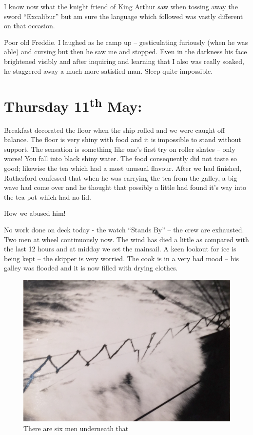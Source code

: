 \documentclass[
  11pt,
  msmallroyalvopaper
]{memoir}
\begin{document}
I know now what the knight friend of King Arthur saw when tossing away
the sword ``Excalibur'' but am sure the language which followed was
vastly different on that occasion.

Poor old Freddie. I laughed as he camp up -- gesticulating furiously
(when he was able) and cursing but then he saw me and stopped. Even in
the darkness his face brightened visibly and after inquiring and
learning that I also was really soaked, he staggered away a much more
satisfied man. Sleep quite impossible.

\hypertarget{thursday-11th-may}{%
\section{\texorpdfstring{Thursday 11\textsuperscript{th}
May:}{Thursday 11th May:}}\label{thursday-11th-may}}

Breakfast decorated the floor when the ship rolled and we were caught
off balance. The floor is very shiny with food and it is impossible to
stand without support. The sensation is something like one's first try
on roller skates -- only worse! You fall into black shiny water. The
food consequently did not taste so good; likewise the tea which had a
most unusual flavour. After we had finished, Rutherford confessed that
when he was carrying the tea from the galley, a big wave had come over
and he thought that possibly a little had found it's way into the tea
pot which had no lid.

How we abused him!

No work done on deck today - the watch ``Stands By'' -- the crew are
exhausted. Two men at wheel continuously now. The wind has died a little
as compared with the last 12 hours and at midday we set the mainsail. A
keen lookout for ice is being kept -- the skipper is very worried. The
cook is in a very bad mood -- his galley was flooded and it is now
filled with drying clothes.

\begin{figure}
\centering
\includegraphics{./images/image011.jpg}
\caption{There are six men underneath that}
\end{figure}
\end{document}
